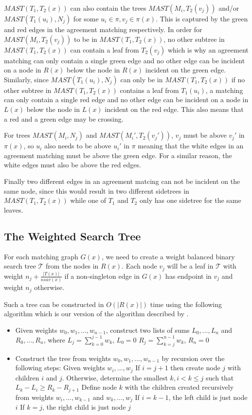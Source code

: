 $MAST(T_1, T_2(x))$ can also contain the trees $MAST(M_i, T_2(v_j))$ and/or $MAST(T_1(u_i), N_j)$ for some $u_i \in \pi, v_j \in \pi(x)$. This is captured by the green and red edges in the agreement matching respectively. In order for $MAST(M_i, T_2(v_j))$ to be in $MAST(T_1, T_2(x))$, no other subtree in $MAST(T_1, T_2(x))$ can contain a leaf from $T_2(v_j)$ which is why an agreement matching can only contain a single green edge and no other edge can be incident on a node in $R(x)$ below the node in $R(x)$ incident on the green edge. Similarly, since $MAST(T_1(u_i), N_j)$ can only be in $MAST(T_1, T_2(x))$ if no other subtree in $MAST(T_1, T_2(x))$ contains a leaf from $T_1(u_i)$, a matching can only contain a single red edge and no other edge can be incident on a node in $L(x)$ below the node in $L(x)$ incident on the red edge. This also means that a red and a green edge may be crossing.

For trees $MAST(M_i, N_j)$ and $MAST(M_i', T_2(v_j'))$, $v_j$ must be above $v_j'$ in $\pi(x)$, so $u_i$ also needs to be above $u_i'$ in $\pi$ meaning that the white edges in an agreement matching must be above the green edge. For a similar reason, the white edges must also be above the red edges.

Finally two different edges in an agreement matcing can not be incident on the same node, since this would result in two different sidetrees in $MAST(T_1, T_2(x))$ while one of $T_1$ and $T_2$ only has one sidetree for the same leaves.

\subsection{The Weighted Search Tree}
For each matching graph $G(x)$, we need to create a weight balanced binary search tree $\mathcal{T}$ from the nodes in $R(x)$. Each node $v_j$ will be a leaf in $\mathcal{T}$ with weight $n_j + \frac{|T(x)|}{nsav(x)}$ if a non-singleton edge in $G(x)$ has endpoint in $v_j$ and weight $n_j$ otherwise.

Such a tree can be constructed in $O(|R(x)|)$ time using the following algorithm which is our version of the algorithm described by .

\begin{itemize}
	\item Given weights ${w_0, w_1, ..., w_{n-1}}$, construct two lists of sums ${L_0, ..., L_{n}}$ and ${R_0, ..., R_{n}}$, where
	\subitem $L_j=\sum_{k=0}^{j-1} w_k$, $L_0=0$
	\subitem $R_j=\sum_{k=j}^{n-1} w_k$, $R_{n}=0$
	\item Construct the tree from weights ${w_0, w_1, ..., w_{n-1}}$ by recursion over the following steps:
	\subitem Given weights ${w_i, ..., w_j}$
	\subitem If $i=j+1$ then create node $j$ with children $i$ and $j$.
	\subitem Otherwise, determine the smallest $k, i<k\le j$ such that
	\subsubitem $L_k-L_i \ge R_k-R_{j+1}$
	\subitem Define node $k$ with the children created recursively from weights
	\subsubitem ${w_i, ..., w_{k-1}}$ and ${w_k, ..., w_j}$
	\subsubitem If $i=k-1$, the left child is just node $i$
	\subsubitem If $k=j$, the right child is just node $j$
\end{itemize}

